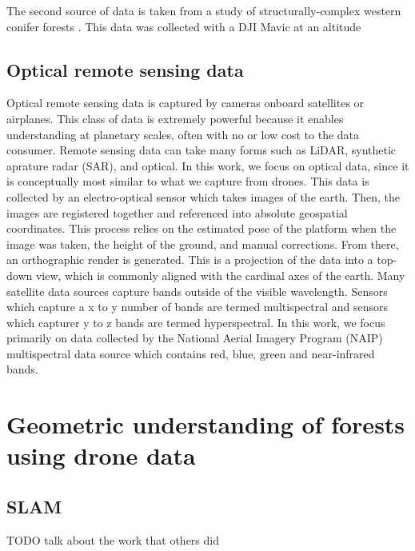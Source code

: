 The second source of data is taken from a study of structurally-complex western conifer forests \cite{Young2022OptimizingForests}. This data was collected with a DJI Mavic at an altitude

\subsection{Optical remote sensing data}
Optical remote sensing data is captured by cameras onboard satellites or airplanes. This class of data is extremely powerful because it enables understanding at planetary scales, often with no or low cost to the data consumer. Remote sensing data can take many forms such as LiDAR, synthetic aprature radar (SAR), and optical. In this work, we focus on optical data, since it is conceptually most similar to what we capture from drones. This data is collected by an electro-optical sensor which takes images of the earth. Then, the images are registered together and referenced into absolute geospatial coordinates. This process relies on the estimated pose of the platform when the image was taken, the height of the ground, and manual corrections. From there, an orthographic render is generated. This is a projection of the data into a top-down view, which is commonly aligned with the cardinal axes of the earth. Many satellite data sources capture bands outside of the visible wavelength. Sensors which capture a x to y number of bands are termed multispectral and sensors which capturer y to z bands are termed hyperspectral. In this work, we focus primarily on data collected by the National Aerial Imagery Program (NAIP) multispectral data source which contains red, blue, green and near-infrared bands.

\section{Geometric understanding of forests using drone data}
\subsection{SLAM}
TODO talk about the work that others did

